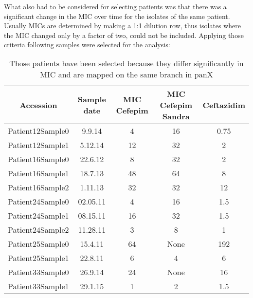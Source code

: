 What also had to be considered for selecting patients was that there was a significant change in the MIC over time for the isolates of the same patient. Usually MICs are determined by making a 1:1 dilution row, thus isolates where the MIC changed only by a factor of two, could not be included. 
Applying those criteria following samples were selected for the analysis:
\begin{table}
	\begin{tabular}{|c c c c c|}	
		\hline
		Accession & Sample date & MIC Cefepim & MIC Cefepim Sandra & Ceftazidim \\ [0.5ex]
		\hline\hline
		Patient12Sample0 & 9.9.14 & 4 & 16 & 0.75 \\
		Patient12Sample1 & 5.12.14 & 12 & 32 & 2 \\
		\hline
		Patient16Sample0 & 22.6.12 & 8 & 32 & 2\\
		Patient16Sample1 & 18.7.13 & 48 & 64 & 8\\
		Patient16Sample2 & 1.11.13 & 32 & 32 & 12\\
		\hline
		Patient24Sample0 & 02.05.11 & 4 & 16 & 1.5\\
		Patient24Sample1 & 08.15.11 & 16 & 32 & 1.5\\
		Patient24Sample2 & 11.28.11 & 3 & 8 & 1\\
		\hline
		Patient25Sample0 & 15.4.11 & 64 & None & 192\\
		Patient25Sample1 & 22.8.11 & 6 & 4 & 6\\
		\hline
		Patient33Sample0 & 26.9.14 & 24 & None & 16 \\
		Patient33Sample1 & 29.1.15 & 1 & 2 & 1.5\\
		\hline
	\end{tabular}
	\caption{Those patients have been selected because they differ significantly in MIC and are mapped on the same branch in panX}
	\label{table:samples_overview}	
\end{table}


